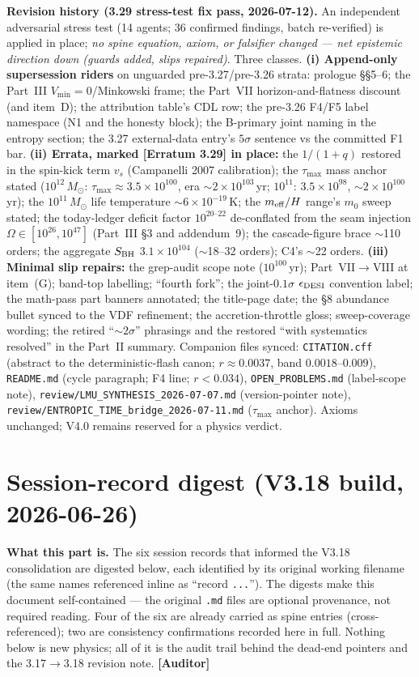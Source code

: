 \documentclass[11pt]{article}
\newcommand{\Auditor}{\textbf{\textcolor{teal!55!black}{[Auditor]}}}
\newcommand{\msun}{M_\odot}
\begin{document}
{\smallskip\noindent\textbf{Revision history (3.29 stress-test fix pass, 2026-07-12).} An independent adversarial stress test (14 agents; 36 confirmed findings, batch re-verified) is applied in place; \emph{no spine equation, axiom, or falsifier changed --- net epistemic direction down (guards added, slips repaired)}. Three classes. \textbf{(i) Append-only supersession riders} on unguarded pre-3.27/pre-3.26 strata: prologue \S\S5--6; the Part~III $V_{\min}=0$/Minkowski frame; the Part~VII horizon-and-flatness discount (and item~D); the attribution table's CDL row; the pre-3.26 F4/F5 label namespace (N1 and the honesty block); the B-primary joint naming in the entropy section; the 3.27 external-data entry's $5\sigma$ sentence vs the committed F1 bar. \textbf{(ii) Errata, marked [Erratum 3.29] in place:} the $1/(1+q)$ restored in the spin-kick term $v_s$ (Campanelli 2007 calibration); the $\tau_{\max}$ mass anchor stated ($10^{12}\,\msun$: $\tau_{\max}\approx3.5\times10^{100}$, era $\sim2\times10^{103}$\,yr; $10^{11}$: $3.5\times10^{98}$, $\sim2\times10^{100}$\,yr); the $10^{11}\,\msun$ life temperature $\sim6\times10^{-19}$\,K; the $m_{\rm eff}/H$ range's $m_0$ sweep stated; the today-ledger deficit factor $10^{20\text{--}22}$ de-conflated from the seam injection $\Omega\in[10^{26},10^{47}]$ (Part~III \S3 and addendum~9); the cascade-figure brace $\sim$110 orders; the aggregate $S_{\rm BH}$ $3.1\times10^{104}$ ($\sim$18--32 orders); C4's $\sim$22 orders. \textbf{(iii) Minimal slip repairs:} the grep-audit scope note ($10^{100}$\,yr); Part~VII$\to$VIII at item~(G); band-top labelling; ``fourth fork''; the joint-$0.1\sigma$ $\epsilon_{\rm DESI}$ convention label; the math-pass part banners annotated; the title-page date; the \S8 abundance bullet synced to the VDF refinement; the accretion-throttle gloss; sweep-coverage wording; the retired ``$\sim2\sigma$'' phrasings and the restored ``with systematics resolved'' in the Part~II summary. Companion files synced: \texttt{CITATION.cff} (abstract to the deterministic-flash canon; $r\approx0.0037$, band $0.0018$--$0.009$), \texttt{README.md} (cycle paragraph; F4 line; $r<0.034$), \texttt{OPEN\_PROBLEMS.md} (label-scope note), \texttt{review/LMU\_SYNTHESIS\_2026-07-07.md} (version-pointer note), \texttt{review/ENTROPIC\_TIME\_bridge\_2026-07-11.md} ($\tau_{\max}$ anchor). Axioms unchanged; V4.0 remains reserved for a physics verdict.

}

\part{Session-record digest (V3.18 build, 2026-06-26)}
\noindent\textbf{What this part is.} The six session records that informed the V3.18 consolidation are digested below, each identified by its original working filename (the same names referenced inline as ``record \texttt{...}''). The digests make this document self-contained --- the original \texttt{.md} files are optional provenance, not required reading. Four of the six are already carried as spine entries (cross-referenced); two are consistency confirmations recorded here in full. Nothing below is new physics; all of it is the audit trail behind the dead-end pointers and the 3.17$\to$3.18 revision note. \Auditor
\end{document}

